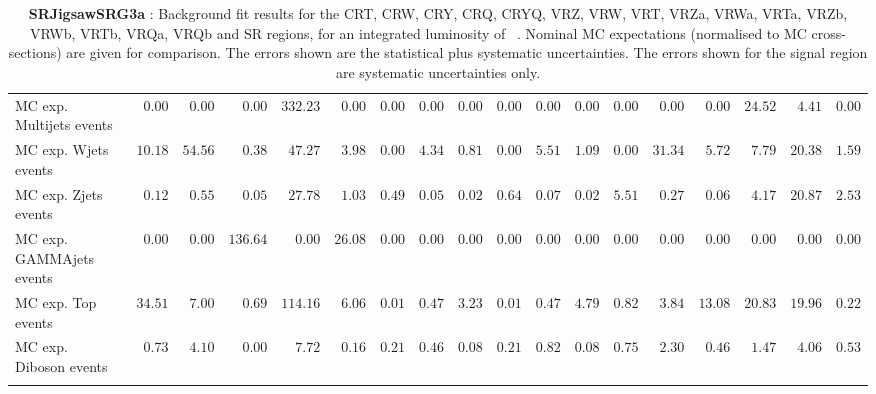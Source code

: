 \begin{table}
{\begin{tabular*}{\textwidth}{@{\extracolsep{\fill}}lrrrrrrrrrrrrrrrrr}
\noalign{\smallskip}\hline\noalign{\smallskip}
        MC exp. Multijets events         & $0.00$          & $0.00$          & $0.00$          & $332.23$          & $0.00$          & $0.00$          & $0.00$          & $0.00$          & $0.00$          & $0.00$          & $0.00$          & $0.00$          & $0.00$          & $0.00$          & $24.52$          & $4.41$          & $0.00$              \\
        MC exp. Wjets events         & $10.18$          & $54.56$          & $0.38$          & $47.27$          & $3.98$          & $0.00$          & $4.34$          & $0.81$          & $0.00$          & $5.51$          & $1.09$          & $0.00$          & $31.34$          & $5.72$          & $7.79$          & $20.38$          & $1.59$              \\
        MC exp. Zjets events         & $0.12$          & $0.55$          & $0.05$          & $27.78$          & $1.03$          & $0.49$          & $0.05$          & $0.02$          & $0.64$          & $0.07$          & $0.02$          & $5.51$          & $0.27$          & $0.06$          & $4.17$          & $20.87$          & $2.53$              \\
        MC exp. GAMMAjets events         & $0.00$          & $0.00$          & $136.64$          & $0.00$          & $26.08$          & $0.00$          & $0.00$          & $0.00$          & $0.00$          & $0.00$          & $0.00$          & $0.00$          & $0.00$          & $0.00$          & $0.00$          & $0.00$          & $0.00$              \\
        MC exp. Top events         & $34.51$          & $7.00$          & $0.69$          & $114.16$          & $6.06$          & $0.01$          & $0.47$          & $3.23$          & $0.01$          & $0.47$          & $4.79$          & $0.82$          & $3.84$          & $13.08$          & $20.83$          & $19.96$          & $0.22$              \\
        MC exp. Diboson events         & $0.73$          & $4.10$          & $0.00$          & $7.72$          & $0.16$          & $0.21$          & $0.46$          & $0.08$          & $0.21$          & $0.82$          & $0.08$          & $0.75$          & $2.30$          & $0.46$          & $1.47$          & $4.06$          & $0.53$              \\
\noalign{\smallskip}\hline\noalign{\smallskip}
\end{tabular*}
}
\caption{{\bf SRJigsawSRG3a} : Background fit results for the CRT, CRW, CRY, CRQ, CRYQ, VRZ, VRW, VRT, VRZa, VRWa, VRTa, VRZb, VRWb, VRTb, VRQa, VRQb and SR regions, for an integrated luminosity of \ourintlumi~\ifb. Nominal MC expectations (normalised to MC cross-sections) are given for comparison. The errors shown are the statistical plus systematic uncertainties. The errors shown for the signal region are systematic uncertainties only.}
\label{table.results.systematics.in.logL.fit.CRT.CRW.CRY.CRQ.CRYQ.VRZ.VRW.VRT.VRZa.VRWa.VRTa.VRZb.VRWb.VRTb.VRQa.VRQb.SR.SRJigsawSRG3a}
\end{table}
%